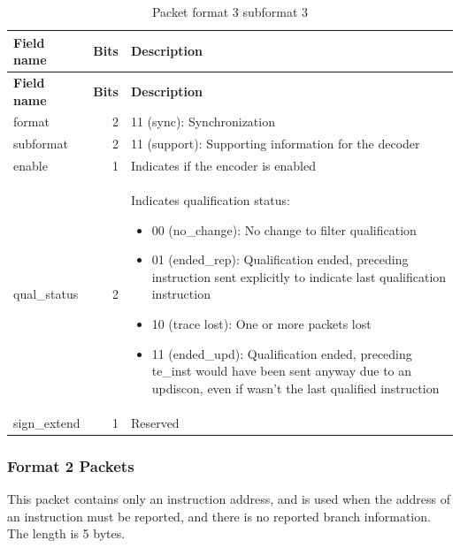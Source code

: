 \documentclass[main\_\_EN.tex]{subfiles}
\begin{document}
\begin{longtable}[c]{ |l|r|L{11cm}| }
    \caption{Packet format 3 subformat 3}
    \label{tab:f3s3}
    \\\hline{}
    \textbf{Field name} & \textbf{Bits} & \textbf{Description} \\\hline
    \endfirsthead
    \textbf{Field name} & \textbf{Bits} & \textbf{Description} \\\hline
    \endhead
    \endfoot
    \endlastfoot

    format & 2 & 11 (sync): Synchronization \\\hline
    subformat & 2 & 11 (support): Supporting information for the decoder \\\hline
    enable & 1 & Indicates if the encoder is enabled \\\hline
    qual\_status & 2 & Indicates qualification status:
    \begin{itemize}
        \item 00 (no\_change): No change to filter qualification
        \item 01 (ended\_rep): Qualification ended, preceding instruction sent explicitly to indicate last qualification instruction
        \item 10 (trace lost): One or more packets lost
        \item 11 (ended\_upd): Qualification ended, preceding te\_inst would have been sent anyway due to an updiscon, even if wasn't the last qualified instruction
        \vspace{-1.5em}
    \end{itemize}
    \\\hline
    sign\_extend & 1 & Reserved \\\hline

 \end{longtable}




\subsubsection{Format 2 Packets}

This packet contains only an instruction address, and is used when the address of an instruction must be reported, and there is no reported branch information. The length is 5 bytes.
\end{document}
